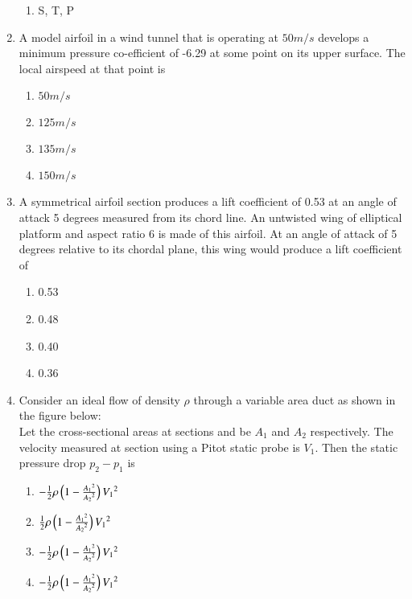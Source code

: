 \documentclass[journal]{IEEEtran}
\begin{document}
\begin{enumerate}
\begin{enumerate}
			\item S, T, P
		\end{enumerate}
	\item
	A model airfoil in a wind tunnel that is operating at $50 m/s$ develops a minimum pressure co-efficient of -6.29 at some point on its upper surface. The local airspeed at that point is 
		\begin{enumerate}
			\item $50 m/s$
			\item $125 m/s$
			\item $135 m/s$
			\item $150 m/s$
		\end{enumerate}
	\item
	A symmetrical airfoil section produces a lift coefficient of 0.53 at an angle of attack 5 degrees measured from its chord line. An untwisted wing of elliptical platform and aspect ratio 6 is made of this airfoil. At an angle of attack of 5 degrees relative to its chordal plane, this wing would produce a lift coefficient of
		\begin{enumerate}
			\item 0.53
			\item 0.48
			\item 0.40
			\item 0.36
		\end{enumerate}
	\item
	Consider an ideal flow of density $\rho$ through a variable area duct as shown in the figure below:  \\
	
	
	
	Let the cross-sectional areas at sections  and  be $A_1$ and $A_2$ respectively. The velocity measured at section  using a Pitot static probe is $V_1$. Then the static pressure drop $p_2 - p_1$ is
		\begin{figure}[h!]
    			\centering
    			
    			\caption{}
    			\label{36}
		\end{figure}

		\begin{enumerate}
			\item $-\frac{1}{2}\rho\left(1-\frac{{A_{1}}^{2}}{{A_{2}}^{2}}\right){V_1}^{2}$
			\item $\frac{1}{2}\rho\left(1-\frac{{A_{1}}^{2}}{{A_{2}}^{2}}\right){V_1}^{2}$
			\item $-\frac{1}{2}\rho\left(1-\frac{{A_{1}}^{2}}{{A_{2}}^{2}}\right){V_1}^{2}$
			\item $-\frac{1}{2}\rho\left(1-\frac{{A_{1}}^{2}}{{A_{2}}^{2}}\right){V_1}^{2}$
		\end{enumerate}
	
			
			
			
			
			
\end{enumerate}
\end{document}
